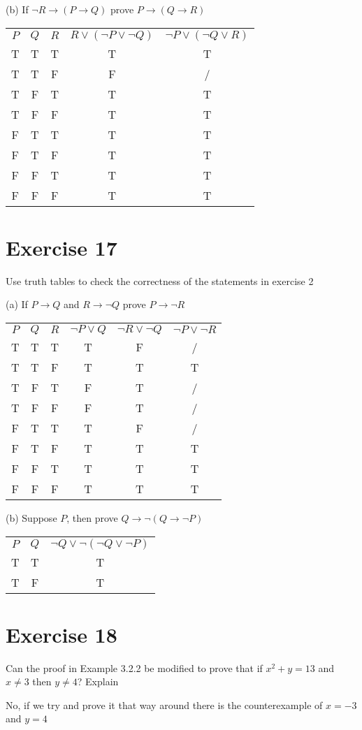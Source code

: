 \documentclass[11pt]{article}
\newcommand{\then}{\rightarrow}
\begin{document}
\noindent (b) If $\neg R \then (P \then Q)$ prove $P \then (Q \then R)$

\begin{center}
    \begin{tabular}{ c c c c c }
     $P$ & $Q$ & $R$ & $R \vee (\neg P \vee \neg Q)$ & $\neg P \vee (\neg Q \vee R)$\\ 
    T & T & T & T & T \\  
    T & T & F & F & / \\
    T & F & T & T & T \\  
    T & F & F & T & T \\
    F & T & T & T & T \\  
    F & T & F & T & T \\
    F & F & T & T & T \\  
    F & F & F & T & T 
    \end{tabular}
\end{center}

\section*{Exercise 17}

Use truth tables to check the correctness of the statements in exercise 2

\noindent (a) If $P \then Q$ and $R \then \neg Q$ prove $P \then \neg R$

\begin{center}
    \begin{tabular}{ c c c c c c }
     $P$ & $Q$ & $R$ & $\neg P \vee Q$ & $\neg R \vee \neg Q$ & $\neg P \vee \neg R$\\ 
    T & T & T & T & F & /\\  
    T & T & F & T & T & T\\
    T & F & T & F & T & /\\  
    T & F & F & F & T & /\\
    F & T & T & T & F & /\\  
    F & T & F & T & T & T\\
    F & F & T & T & T & T\\  
    F & F & F & T & T & T
    \end{tabular}
\end{center}

\noindent (b) Suppose $P$, then prove $Q \then \neg (Q \then \neg P)$

\begin{center}
    \begin{tabular}{ c c c  }
     $P$ & $Q$ & $\neg Q \vee \neg (\neg Q \vee \neg P) $\\ 
    T & T & T\\  
    T & F & T
    \end{tabular}
\end{center}

\section*{Exercise 18} 

Can the proof in Example 3.2.2 be modified to prove that if $x^2 + y = 13$ and 
$x \neq 3$ then $y \neq 4$? Explain

No, if we try and prove it that way around there is the counterexample of 
$x = -3$ and $y = 4$
\end{document}

